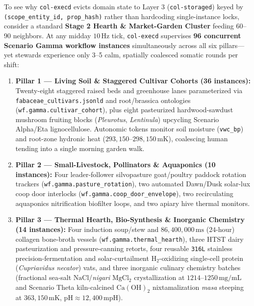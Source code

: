 To see why \texttt{col-execd} evicts domain state to Layer 3 (\texttt{col-storaged}) keyed by
\texttt{(scope\_entity\_id, prop\_hash)} rather than hardcoding single-instance locks,
consider a standard \textbf{Stage 2 Hearth \& Market-Garden Cluster} feeding 60--90
neighbors. At any midday $10\,\mathrm{Hz}$ tick, \texttt{col-execd} supervises \textbf{96 concurrent
Scenario Gamma workflow instances} simultaneously across all six pillars---yet stewards
experience only 3--5 calm, spatially coalesced somatic rounds per shift:
\begin{enumerate}
    \item \textbf{Pillar 1 --- Living Soil \& Staggered Cultivar Cohorts (36 instances):}
    Twenty-eight staggered raised beds and greenhouse lanes parameterized via
    \texttt{fabaceae\_cultivars.jsonld} and root/brassica ontologies
    (\texttt{wf.gamma.cultivar\_cohort}), plus eight pasteurized hardwood-sawdust mushroom
    fruiting blocks (\textit{Pleurotus}, \textit{Lentinula}) upcycling Scenario Alpha/Eta
    lignocellulose. Autonomic tokens monitor soil moisture (\texttt{vwc\_bp}) and root-zone
    hydronic heat ($293{,}150\text{--}298{,}150\,\mathrm{mK}$), coalescing human tending into
    a single morning garden walk.
    \item \textbf{Pillar 2 --- Small-Livestock, Pollinators \& Aquaponics (10 instances):}
    Four leader-follower silvopasture goat/poultry paddock rotation trackers
    (\texttt{wf.gamma.pasture\_rotation}), two automated Dawn/Dusk solar-lux coop door
    interlocks (\texttt{wf.gamma.coop\_door\_envelope}), two recirculating aquaponics
    nitrification biofilter loops, and two apiary hive thermal monitors.
    \item \textbf{Pillar 3 --- Thermal Hearth, Bio-Synthesis \& Inorganic Chemistry (14 instances):}
    Four induction soup/stew and $86{,}400{,}000\,\mathrm{ms}$ ($24\text{-hour}$) collagen
    bone-broth vessels (\texttt{wf.gamma.thermal\_hearth}), three HTST dairy pasteurization
    and pressure-canning retorts, four reusable \texttt{316L} stainless precision-fermentation
    and solar-curtailment $\mathrm{H_2}$-oxidizing single-cell protein (\textit{Cupriavidus
    necator}) vats, and three inorganic culinary chemistry batches (fractional sea-salt
    $\mathrm{NaCl}$/\textit{nigari} $\mathrm{MgCl_2}$ crystallization at $1214\text{--}1250\,\mathrm{mg/mL}$
    and Scenario Theta kiln-calcined $\mathrm{Ca(OH)_2}$ nixtamalization \textit{masa} steeping at
    $363{,}150\,\mathrm{mK}$, $\mathrm{pH} \approx 12{,}400\,\mathrm{mpH}$).

\end{enumerate}
